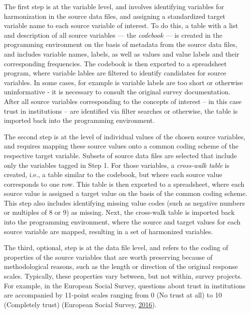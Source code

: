 \documentclass[12pt,]{article}
\begin{document}
The first step is at the variable level, and involves identifying variables for harmonization in the source data files, and assigning a standardized target variable name to each source variable of interest. To do this, a table with a list and description of all source variables --- the \emph{codebook} --- is created in the programming environment on the basis of metadata from the source data files, and includes variable names, labels, as well as values and value labels and their corresponding frequencies. The codebook is then exported to a spreadsheet program, where variable lables are filtered to identify candidates for source variables. In some cases, for example is variable labels are too short or otherwise uninformative - it is necessary to consult the original survey documentation. After all source variables corresponding to the concepts of interest -- in this case trust in institutions -- are identified via filter searches or otherwise, the table is imported back into the programming environment.

The second step is at the level of individual values of the chosen source variables, and requires mapping these source values onto a common coding scheme of the respective target variable. Subsets of source data files are selected that include only the variables tagged in Step 1. For those variables, a \emph{cross-walk table} is created, i.e., a table similar to the codebook, but where each source value corresponds to one row. This table is then exported to a spreadsheet, where each source value is assigned a target value on the basis of the common coding scheme. This step also includes identifying missing value codes (such as negative numbers or multiples of 8 or 9) as missing. Next, the cross-walk table is imported back into the programming environment, where the source and target values for each source variable are mapped, resulting in a set of harmonized variables.

The third, optional, step is at the data file level, and refers to the coding of properties of the source variables that are worth preserving because of methodological reasons, such as the length or direction of the original response scales. Typically, these properties vary between, but not within, survey projects. For example, in the European Social Survey, questions about trust in institutions are accompanied by 11-point scales ranging from 0 (No trust at all) to 10 (Completely trust) (European Social Survey, \protect\hyperlink{ref-ESS2016b}{2016}).
\end{document}
